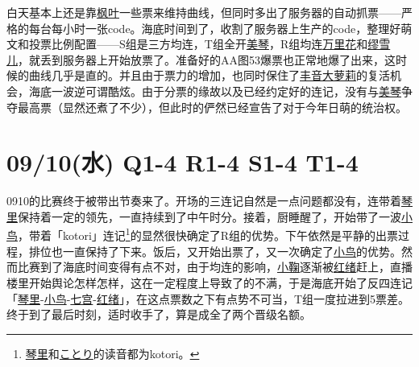 
白天基本上还是靠\uline{枫叶}一些票来维持曲线，但同时多出了服务器的自动抓票——严格的每台每小时一张code。海底时间到了，收割了服务器上生产的code，整理好萌文和投票比例配置——S组是三方均连，T组全开\uline{美琴}，R组均连\uline{万里花}和\uline{缪雪儿}，就丢到服务器上开始放票了。准备好的AA图53爆票也正常地爆了出来，这时候的曲线几乎是直的。并且由于票力的增加，也同时保住了\uline{丰音大萝莉}的复活机会，海底一波逆可谓酷炫。由于分票的缘故以及已经约定好的连记，没有与\uline{美琴}争夺最高票（显然还煮了不少），但此时的俨然已经宣告了对于今年日萌的统治权。

\section{09/10(水) Q1-4 R1-4 S1-4 T1-4}


0910的比赛终于被带出节奏来了。开场的三连记自然是一点问题都没有，连带着\uline{琴里}保持着一定的领先，一直持续到了中午时分。接着，厨睡醒了，开始带了一波\uline{小鸟}，带着「kotori」连记\footnote{\uline{琴里}和\uline{ことり}的读音都为kotori。}的显然很快确定了R组的优势。下午依然是平静的出票过程，排位也一直保持了下来。饭后，又开始出票了，又一次确定了\uline{小鸟}的优势。然而比赛到了海底时间变得有点不对，由于均连的影响，\uline{小鞠}逐渐被\uline{红绪}赶上，直播楼里开始舆论怎样怎样，这在一定程度上导致了的不满，于是海底开始了反四连记「\uline{琴里}-\uline{小鸟}-\uline{七宫}-\uline{红绪}」，在这点票数之下有点势不可当，T组一度拉进到5票差。终于到了最后时刻，适时收手了，算是成全了两个晋级名额。

